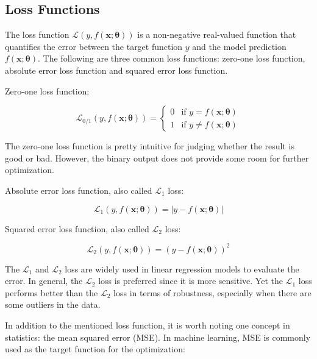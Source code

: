 \documentclass[
	parskip, 			   %
	twoside, 			   %
	DIV=14, 			   %
	BCOR=15.0mm, 		   %
	headsepline, 		   %
	open=right, 		   %
	captions=tableheading, %
	bibliography=totoc,    %
	numbers=noenddot       %
]{scrreprt}
\begin{document}
\subsection{Loss Functions}
The loss function $\mathcal{L}\left( y,f(\mathbf{x};\mathbf{\theta}) \right)$ is a non-negative real-valued function that quantifies the error between the target function $y$ and the model prediction $f(\mathbf{x};\mathbf{\theta})$. The following are three common loss functions: zero-one loss function, absolute error loss function and squared error loss function.

Zero-one loss function:

\begin{equation}
    \label{eq:zero_one_loss}
    \mathcal{L}_{0/1}\left( y,f \left(\mathbf{x};\mathbf{\theta} \right) \right) = \begin{cases} 0 & \text{if } y=f(\mathbf{x};\mathbf{\theta}) \\ 1 & \text{if } y \neq f(\mathbf{x};\mathbf{\theta})
    \end{cases}
\end{equation}

The zero-one loss function is pretty intuitive for judging whether the result is good or bad. However, the binary output does not provide some room for further optimization.

Absolute error loss function, also called $\mathcal{L}_{1}$ loss:

\begin{equation}
    \label{eq:AE_loss}
    \mathcal{L}_{1}\left( y,f(\mathbf{x};\mathbf{\theta}) \right) = |y-f(\mathbf{x};\mathbf{\theta})|
\end{equation}

Squared error loss function, also called $\mathcal{L}_{2}$ loss:

\begin{equation}
    \label{eq:SE_loss}
    \mathcal{L}_{2}\left( y,f(\mathbf{x};\mathbf{\theta}) \right) = (y-f(\mathbf{x};\mathbf{\theta}))^2
\end{equation}

The $\mathcal{L}_{1}$ and $\mathcal{L}_{2}$ loss are widely used in linear regression models to evaluate the error. In general, the $\mathcal{L}_{2}$ loss is preferred since it is more sensitive. Yet the $\mathcal{L}_{1}$ loss performs better than the $\mathcal{L}_{2}$ loss in terms of robustness, especially when there are some outliers in the data.

In addition to the mentioned loss function, it is worth noting one concept in statistics: the mean squared error (MSE). In machine learning, MSE is commonly used as the target function for the optimization:
\end{document}
